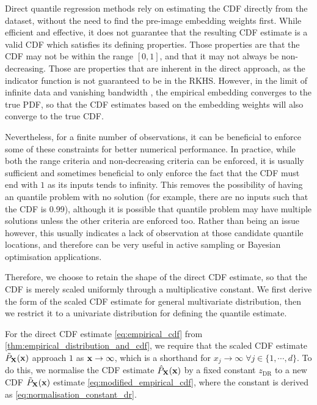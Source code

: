 \documentclass[twoside]{article} \usepackage{aistats2017}
\theoremstyle{definition}
\theoremstyle{theorem}
\newcommand{\rv}[1]{{#1}}
\begin{document}
		Direct quantile regression methods rely on estimating the CDF directly from the dataset, without the need to find the pre-image embedding weights first. While efficient and effective, it does not guarantee that the resulting CDF estimate is a valid CDF which satisfies its defining properties. Those properties are that the CDF may not be within the range $[0, 1]$, and that it may not always be non-decreasing. Those are properties that are inherent in the direct approach, as the indicator function is not guaranteed to be in the RKHS. However, in the limit of infinite data and vanishing bandwidth \citep{kanagawa2016filtering}, the empirical embedding converges to the true PDF, so that the CDF estimates based on the embedding weights will also converge to the true CDF.
		
		Nevertheless, for a finite number of observations, it can be beneficial to enforce some of these constraints for better numerical performance. In practice, while both the range criteria and non-decreasing criteria can be enforced, it is usually sufficient and sometimes beneficial to only enforce the fact that the CDF must end with $1$ as its inputs tends to infinity. This removes the possibility of having an quantile problem with no solution (for example, there are no inputs such that the CDF is 0.99), although it is possible that quantile problem may have multiple solutions unless the other criteria are enforced too. Rather than being an issue however, this usually indicates a lack of observation at those candidate quantile locations, and therefore can be very useful in active sampling or Bayesian optimisation applications.
		
		Therefore, we choose to retain the shape of the direct CDF estimate, so that the CDF is merely scaled uniformly through a multiplicative constant. We first derive the form of the scaled CDF estimate for general multivariate distribution, then we restrict it to a univariate distribution for defining the quantile estimate.
		
		For the direct CDF estimate \eqref{eq:empirical_cdf} from \cref{thm:empirical_distribution_and_cdf}, we require that the scaled CDF estimate $\tilde{P}_{\bvec{\rv{X}}}(\bvec{x})$ approach $1$ as $\mathbf{x} \to \infty $, which is a shorthand for $x_{j} \to \infty \; \forall j \in \{1, \cdots, d\}$. To do this, we normalise the CDF estimate $\hat{P}_{\bvec{\rv{X}}}(\bvec{x})$ by a fixed constant $z_{\mathrm{DR}}$ to a new CDF $\tilde{P}_{\bvec{\rv{X}}}(\bvec{x})$ estimate \eqref{eq:modified_empirical_cdf}, where the constant is derived as \eqref{eq:normalisation_constant_dr}.
		
\end{document}
